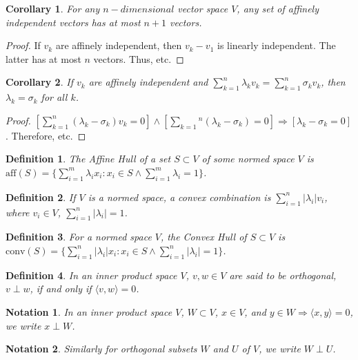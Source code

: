 \documentclass[12pt,oneside]{book}
\theoremstyle{mystyle}
\newtheorem{definition}{Definition}[section]
\newtheorem{corollary}{Corollary}[section]
\newtheorem{notation}{Notation}[section]
\begin{document}
\begin{corollary}
For any $n-dimensional$ vector space $V$, any set of affinely independent vectors has at most $n+1$ vectors.
\end{corollary}
\begin{proof}
If $v_k$ are affinely independent, then $v_k-v_1$ is linearly independent. The latter has at most $n$ vectors. Thus, etc.
\end{proof}

\begin{corollary}
If $v_k$ are affinely independent and $\sum_{k=1}^{n}\lambda_k v_k = \sum_{k=1}^{n} \sigma_k v_k$, then $\lambda_k = \sigma_k$ for all $k$.
\end{corollary}
\begin{proof}
$[\sum_{k=1}^{n}(\lambda_k - \sigma_k)v_k = 0]\land[\sum_{k=1}{^n}(\lambda_k-\sigma_k) = 0]\Rightarrow [\lambda_k-\sigma_k = 0]$. Therefore, etc.
\end{proof}

\begin{definition}
The Affine Hull of a set $S\subset V$ of some normed space $V$ is $\textrm{aff}(S) = \{\sum_{i=1}^{m}\lambda_i x_i: x_i \in S\land \sum_{i=1}^{m}\lambda_i =1\}$.
\end{definition}

\begin{definition}
If $V$ is a normed space, a convex combination is $\sum_{i=1}^{n}|\lambda_i| v_i$, where $v_i\in V$, $\sum_{i=1}^{n}|\lambda_i| = 1$.
\end{definition}

\begin{definition}
For a normed space $V$, the Convex Hull of $S\subset V$ is $\textrm{conv}(S)=\{\sum_{i=1}^{n}|\lambda_i| x_i:x_i\in S\land \sum_{i=1}^{n} |\lambda_i| = 1 \}$.
\end{definition}

\begin{definition}
In an inner product space $V$, $v,w\in V$ are said to be orthogonal, $v\perp w$, if and only if $\langle v,w \rangle = 0$.
\end{definition}

\begin{notation}
In an inner product space $V$, $W\subset V$, $x\in V$, and $y\in W \Rightarrow \langle x,y\rangle = 0$, we write $x\perp W$.
\end{notation}

\begin{notation}
Similarly for orthogonal subsets $W$ and $U$ of $V$, we write $W\perp U$.
\end{notation}
\end{document}
